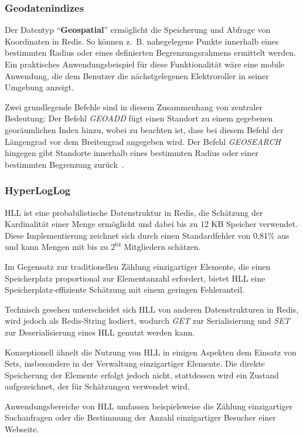 \subsubsection{Geodatenindizes}
Der Datentyp \enquote{\textbf{Geospatial}} ermöglicht die Speicherung und Abfrage von Koordinaten in Redis. So können z.~B. nahegelegene Punkte innerhalb eines bestimmten Radius oder eines definierten Begrenzungsrahmens ermittelt werden.
Ein praktisches Anwendungsbeispiel für diese Funktionalität wäre eine mobile Anwendung, die dem Benutzer die nächstgelegenen Elektroroller in seiner Umgebung anzeigt.

Zwei grundlegende Befehle sind in diesem Zusammenhang von zentraler Bedeutung: Der Befehl \emph{GEOADD} fügt einen Standort zu einem gegebenen georäumlichen Index hinzu, wobei zu beachten ist, dass bei diesem Befehl der Längengrad vor dem Breitengrad angegeben wird. Der Befehl \emph{GEOSEARCH} hingegen gibt Standorte innerhalb eines bestimmten Radius oder einer bestimmten Begrenzung zurück~\cite{redis_ltd_geospatial_nodate}.





\subsubsection{HyperLogLog}
\ac{HLL} ist eine probabilistische Datenstruktur in Redis, die Schätzung der Kardinalität einer Menge ermöglicht und dabei bis zu 12 KB Speicher verwendet. Diese Implementierung zeichnet sich durch einen Standardfehler von 0,81\% aus und kann Mengen mit bis zu \(2^{64}\) Mitgliedern schätzen.

Im Gegensatz zur traditionellen Zählung einzigartiger Elemente, die einen Speicherplatz proportional zur Elementanzahl erfordert, bietet \ac{HLL} eine Speicherplatz-effiziente Schätzung mit einem geringen Fehleranteil.

Technisch gesehen unterscheidet sich \ac{HLL} von anderen Datenstrukturen in Redis, wird jedoch als Redis-String kodiert, wodurch \emph{GET} zur Serialisierung und \emph{SET} zur Deserialisierung eines \ac{HLL} genutzt werden kann.

Konzeptionell ähnelt die Nutzung von \ac{HLL} in einigen Aspekten dem Einsatz von Sets, insbesondere in der Verwaltung einzigartiger Elemente. Die direkte Speicherung der Elemente erfolgt jedoch nicht, stattdessen wird ein Zustand aufgezeichnet, der für Schätzungen verwendet wird.

Anwendungsbereiche von \ac{HLL} umfassen beispielsweise die Zählung einzigartiger Suchanfragen oder die Bestimmung der Anzahl einzigartiger Besucher einer Webseite.

